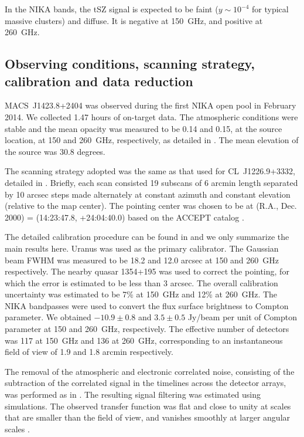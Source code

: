 \documentclass[twocolumn,traditabstract]{aa}
\begin{document}
In the NIKA bands, the tSZ signal is expected to be faint ($y \sim 10^{-4}$ for typical massive clusters) and diffuse. It is negative at 150~GHz, and positive at 260~GHz.

\subsection{Observing conditions, scanning strategy, calibration and data reduction}
\mbox{MACS~J1423.8+2404} was observed during the first NIKA open pool in February 2014. We collected 1.47 hours of on-target data. The atmospheric conditions were stable and the mean opacity was measured to be 0.14 and 0.15, at the source location, at 150 and 260~GHz, respectively, as detailed in \cite{catalano2014}. The mean elevation of the source was 30.8 degrees.

The scanning strategy adopted was the same as that used for \mbox{CL~J1226.9+3332}, detailed in \cite{adam2014}. Briefly, each scan consisted 19 subscans of 6 arcmin length separated by 10 arcsec steps made alternately at constant azimuth and constant elevation (relative to the map center). The pointing center was chosen to be at (R.A., Dec. 2000) = (14:23:47.8, +24:04:40.0) based on the ACCEPT catalog \citep{cavagnolo2009}.

The detailed calibration procedure can be found in \cite{adam2014} and we only summarize the main results here. Uranus was used as the primary calibrator. The Gaussian beam FWHM was measured to be 18.2 and 12.0 arcsec at 150 and 260~GHz respectively. The nearby quasar 1354+195 was used to correct the pointing, for which the error is estimated to be less than 3 arcsec. The overall calibration uncertainty was estimated to be 7\% at 150~GHz and 12\% at 260~GHz. The NIKA bandpasses were used to convert the flux surface brightness to Compton parameter. We obtained $-10.9 \pm 0.8$ and $3.5 \pm 0.5$ Jy/beam per unit of Compton parameter at 150 and 260~GHz, respectively. The effective number of detectors was 117 at 150~GHz and 136 at 260~GHz, corresponding to an instantaneous field of view of 1.9 and 1.8 arcmin respectively.

The removal of the atmospheric and electronic correlated noise, consisting of the subtraction of the correlated signal in the timelines across the detector arrays, was performed as in \cite{adam2014}. The resulting signal filtering was estimated using simulations. The observed transfer function was flat and close to unity at scales that are smaller than the field of view, and vanishes smoothly at larger angular scales \citep[see][]{adam2014}.
\end{document}
